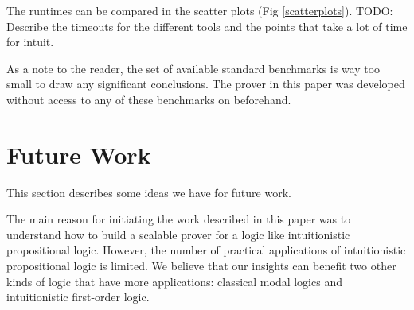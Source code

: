 \documentclass{llncs}
\begin{document}




The runtimes can be compared in the scatter plots (Fig \ref{scatterplots}).
TODO: Describe the timeouts for the different tools and the points that take a lot of time for intuit.



As a note to the reader, the set of available standard benchmarks is way too small to draw any significant conclusions. The prover in this paper was developed without access to any of these benchmarks on beforehand.


\section{Future Work}

This section describes some ideas we have for future work.

The main reason for initiating the work described in this paper was to understand how to build a scalable prover for a logic like intuitionistic propositional logic. However, the number of practical applications of intuitionistic propositional logic is limited. We believe that our insights can benefit two other kinds of logic that have more applications: classical modal logics and intuitionistic first-order logic.
\end{document}
